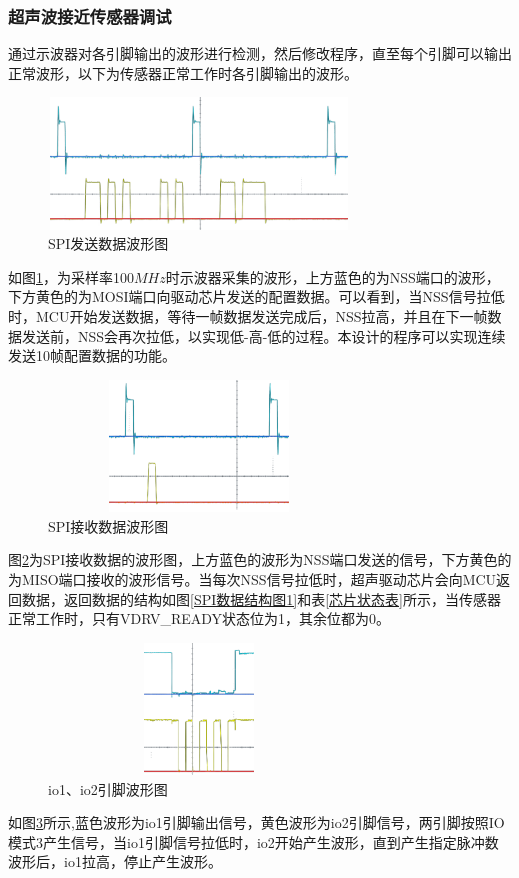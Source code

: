 \subsubsection{超声波接近传感器调试}
通过示波器对各引脚输出的波形进行检测，然后修改程序，直至每个引脚可以输出正常波形，以下为传感器正常工作时各引脚输出的波形。\par
	\begin{figure}[!h]
	    \centering
	    \includegraphics[width=8cm,height=3.5cm]{figure/debug waveform1.png}
	    \caption{SPI发送数据波形图}
	    \label{SPI发送数据波形图}
	\end{figure}\par
 如图\ref{SPI发送数据波形图}，为采样率100$MHz$时示波器采集的波形，上方蓝色的为NSS端口的波形，下方黄色的为MOSI端口向驱动芯片发送的配置数据。可以看到，当NSS信号拉低时，MCU开始发送数据，等待一帧数据发送完成后，NSS拉高，并且在下一帧数据发送前，NSS会再次拉低，以实现低-高-低的过程。本设计的程序可以实现连续发送10帧配置数据的功能。
    \begin{figure}[!h]
	    \centering
	    \includegraphics[width=8cm,height=3.5cm]{figure/debug waveform2.png}
	    \caption{SPI接收数据波形图}
	    \label{SPI接收数据波形图}
	\end{figure}\par
 图\ref{SPI接收数据波形图}为SPI接收数据的波形图，上方蓝色的波形为NSS端口发送的信号，下方黄色的为MISO端口接收的波形信号。当每次NSS信号拉低时，超声驱动芯片会向MCU返回数据，返回数据的结构如图\ref{SPI数据结构图1}和表\ref{芯片状态表}所示，当传感器正常工作时，只有VDRV\_READY状态位为1，其余位都为0。
 \newpage
   \begin{figure}[!h]
	    \centering
	    \includegraphics[width=8cm,height=3.5cm]{figure/debug waveform9.png}
	    \caption{io1、io2引脚波形图}
	    \label{io1、io2引脚波形图}
	\end{figure}\par
 如图\ref{io1、io2引脚波形图}所示,蓝色波形为io1引脚输出信号，黄色波形为io2引脚信号，两引脚按照IO模式3产生信号，当io1引脚信号拉低时，io2开始产生波形，直到产生指定脉冲数波形后，io1拉高，停止产生波形。
 
